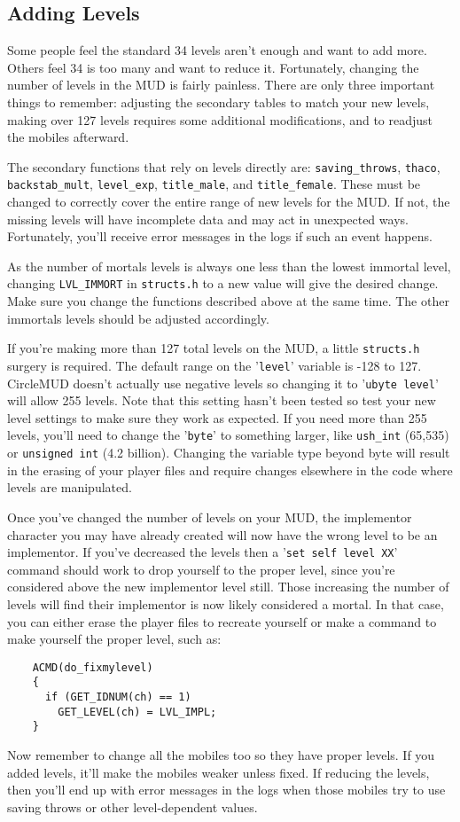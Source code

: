 \documentclass[11pt]{article}
\begin{document}
\subsection{Adding Levels}
Some people feel the standard 34 levels aren't enough and want to add more.  Others feel 34 is too many and want to reduce it.  Fortunately, changing the number of levels in the MUD is fairly painless.  There are only three important things to remember: adjusting the secondary tables to
match your new levels, making over 127 levels requires some additional modifications, and to readjust the mobiles afterward.
\par
The secondary functions that rely on levels directly are: \texttt{saving\_throws}, \texttt{thaco}, \texttt{backstab\_mult}, \texttt{level\_exp}, \texttt{title\_male}, and \texttt{title\_female}.  These must be changed to correctly cover the entire range of new levels for the MUD.  If not, the missing levels will have incomplete data and may act in unexpected ways.  Fortunately, you'll receive error messages in the logs if such an event happens.
\par
As the number of mortals levels is always one less than the lowest immortal level, changing \texttt{LVL\_IMMORT} in \texttt{structs.h} to a new value will give the desired change.  Make sure you change the functions described above at the same time.  The other immortals levels should be adjusted accordingly.
\par
If you're making more than 127 total levels on the MUD, a little \texttt{structs.h} surgery is required.  The default range on the '\texttt{level}' variable is -128 to 127.  CircleMUD doesn't actually use negative levels so changing it to '\texttt{ubyte level}' will allow 255 levels.  Note that this setting hasn't been tested so test your new level settings to make sure they work as expected.  If you need more than 255 levels, you'll need to change the '\texttt{byte}' to something larger, like \texttt{ush\_int} (65,535) or \texttt{unsigned int} (4.2 billion).  Changing the variable type beyond byte will result in the erasing of your player files and require changes elsewhere in the code where levels are manipulated.
\par
Once you've changed the number of levels on your MUD, the implementor character you may have already created will now have the wrong level to be an implementor.  If you've decreased the levels then a '\texttt{set self level XX}' command should work to drop yourself to the proper level, since you're considered above the new implementor level still.  Those increasing the number of levels will find their implementor is now likely considered a mortal.  In that case, you can either erase the player files to recreate yourself or make a command to make yourself the proper level, such as:
\begin{verbatim}
	ACMD(do_fixmylevel)
	{
	  if (GET_IDNUM(ch) == 1)
	    GET_LEVEL(ch) = LVL_IMPL;
	}
\end{verbatim}
Now remember to change all the mobiles too so they have proper levels.  If you added levels, it'll make the mobiles weaker unless fixed.  If reducing the levels, then you'll end up with error messages in the logs when those mobiles try to use saving throws or other level-dependent values.
\end{document}
